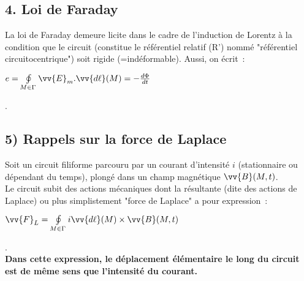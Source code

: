 \documentclass{article}
\newcommand{\mathcolorbox}[2]{\colorbox{#1}{$#2$}}
\let\oldoint\oint
\renewcommand{\oint}{\oldoint\limits}
\renewcommand\overrightarrow{\vv}
\begin{document}
\subsection*{4. Loi de Faraday}
La loi de Faraday demeure licite dans le cadre de
l'induction de Lorentz à la condition que le circuit (constitue le
référentiel relatif (R') nommé "référentiel circuitocentrique") soit
rigide (=indéformable). Aussi, on écrit : \\
\centerline{\mathcolorbox{gray!20}{e=\oint_{M \in
\Gamma}\overrightarrow{E}_{m}.\overrightarrow{d\ell}(M) =
-\frac{d\Phi}{dt}}}.

\subsection*{5)  Rappels sur la force de Laplace}
Soit un circuit filiforme parcouru par un courant
d'intensité $i$ (stationnaire ou dépendant du temps), plongé dans un
champ
magnétique $\overrightarrow{B}(M,t)$. \\
Le circuit subit des actions mécaniques dont la résultante (dite des
actions de Laplace) ou plus simplistement "force de Laplace" a pour
expression : \\
\centerline{\mathcolorbox{gray!20}{\overrightarrow{F}_{L} = \oint_{M \in
\Gamma}i\overrightarrow{d\ell}(M) \times \overrightarrow{B}(M,t)}}.
\\
\textbf{Dans cette expression, le déplacement élémentaire le long du
circuit est de même sens que l'intensité du courant.}
\end{document}
